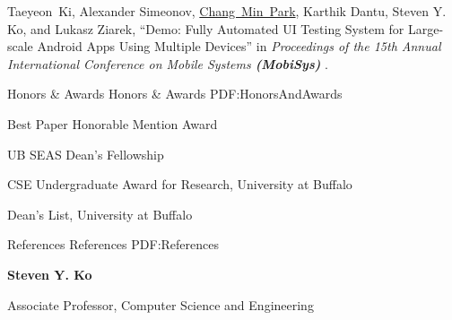 \documentclass[letterpaper,MMMyyyy,nonstopmode]{simpleresumecv}
\begin{document}
\begin{Body}
\Gap
\NumberedItem{[3]}
Taeyeon~Ki, Alexander Simeonov, \underline{Chang~Min~Park}, Karthik Dantu, 
Steven Y. Ko, and Lukasz Ziarek, 
``Demo: Fully Automated UI Testing System for Large-scale Android Apps Using Multiple 
Devices'' in
\textit{Proceedings of the 15th Annual International Conference on Mobile Systems \textbf{(MobiSys)}
}.




\Section
{Honors \&\newline
Awards}
{Honors \& Awards}
{PDF:HonorsAndAwards}

\BulletItem
Best Paper Honorable Mention Award
\hfill
{}

\Gap
\BulletItem
UB SEAS Dean’s Fellowship
\hfill
{}

\Gap
\BulletItem
CSE Undergraduate Award for Research, University at Buffalo
\hfill
{}

\Gap
\BulletItem
Dean's List, University at Buffalo
\hfill
{}








\Section
{References}
{References}
{PDF:References}

\Entry
\textbf{Steven Y. Ko} 

\hspace{1ex}Associate Professor, Computer Science and Engineering


\end{Body}
\end{document}
